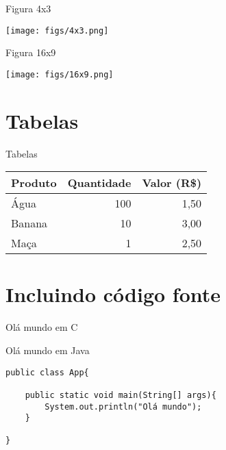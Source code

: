 \documentclass{beamer}
\begin{document}
\begin{frame}{Figura 4x3}
    \begin{center}
        \texttt{[image: figs/4x3.png]}
    \end{center}
\end{frame}
    

\begin{frame}{Figura 16x9}
\begin{center}
    \texttt{[image: figs/16x9.png]}
\end{center}
\end{frame}

\section{Tabelas}

\begin{frame}{Tabelas}
\begin{center}
    \begin{tabular}{l r r}\\\toprule
        Produto & Quantidade & Valor (R\$) \\\midrule
        Água    &      100   &   1,50 \\ 
        Banana  &       10   &   3,00 \\
        Maça    &        1   &   2,50 \\ \bottomrule
    \end{tabular}
\end{center}
\end{frame}

\section{Incluindo código fonte}


\begin{frame}[fragile]{Olá mundo em C}
    
\end{frame}

\begin{frame}[fragile]{Olá mundo em Java}
\begin{lstlisting}[style=java]
public class App{

    public static void main(String[] args){
        System.out.println("Olá mundo");
    }

}
\end{lstlisting}
\end{frame}
\end{document}
